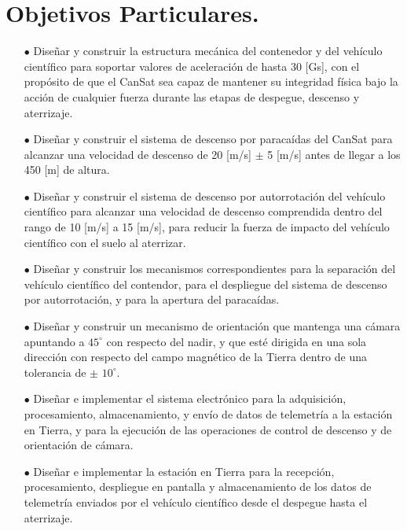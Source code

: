 \section*{Objetivos Particulares.}
\begin{itemize}
\item[$\bullet$]Dise\~nar y construir la estructura mec\'anica del contenedor y del veh\'iculo cient\'ifico para soportar valores de aceleraci\'on de hasta 30 [Gs], con el prop\'osito de que el CanSat sea capaz de mantener su integridad f\'isica bajo la acci\'on de cualquier fuerza durante las etapas de despegue, descenso y aterrizaje.

\item[$\bullet$]Dise\~nar y construir el sistema de descenso por paraca\'idas del CanSat para alcanzar una velocidad de descenso de 20 [m/s] $\pm$ 5 [m/s] antes de llegar a los 450 [m] de altura.

\item[$\bullet$]Dise\~nar y construir el sistema de descenso por autorrotaci\'on del veh\'iculo cient\'ifico para alcanzar una velocidad de descenso comprendida dentro del rango de 10 [m/s] a 15 [m/s], para reducir la fuerza de impacto del veh\'iculo cient\'ifico con el suelo al aterrizar.

\item[$\bullet$]Dise\~nar y construir los mecanismos correspondientes para la separaci\'on del veh\'iculo cient\'ifico del contendor, para el despliegue del sistema de descenso por autorrotaci\'on, y para la apertura del paraca\'idas.

\item[$\bullet$]Dise\~nar y construir un mecanismo de orientaci\'on que mantenga una c\'amara apuntando a $45^{\circ}$ con respecto del nadir, y que est\'e dirigida en una sola direcci\'on con respecto del campo magn\'etico de la Tierra dentro de una tolerancia de $\pm$ $10^{\circ}$. 

\item[$\bullet$]Dise\~nar e implementar el sistema electr\'onico para la adquisici\'on, procesamiento, almacenamiento, y env\'io de datos de telemetr\'ia a la estaci\'on en Tierra, y para la ejecuci\'on de las operaciones de control de descenso y de orientaci\'on de c\'amara.

\item[$\bullet$]Dise\~nar e implementar la estaci\'on en Tierra para la recepci\'on, procesamiento, despliegue en pantalla y almacenamiento de los datos de telemetr\'ia enviados por el veh\'iculo cient\'ifico desde el despegue hasta el aterrizaje.

\end{itemize}